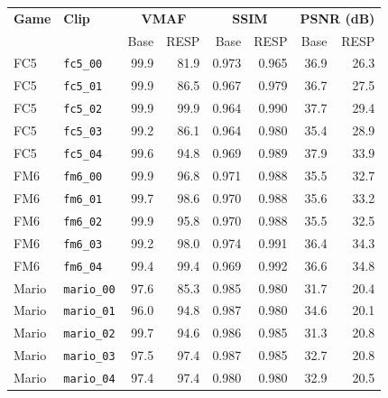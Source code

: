 \begin{tabular}{@{}llrrrrrr@{}}
\toprule
\textbf{Game} & \textbf{Clip} & \multicolumn{2}{c}{\textbf{VMAF}} & \multicolumn{2}{c}{\textbf{SSIM}} & \multicolumn{2}{c}{\textbf{PSNR (dB)}} \\
 & & Base & RESP & Base & RESP & Base & RESP \\
\midrule
FC5 & \texttt{fc5\_00} & 99.9 & 81.9 & 0.973 & 0.965 & 36.9 & 26.3 \\
FC5 & \texttt{fc5\_01} & 99.9 & 86.5 & 0.967 & 0.979 & 36.7 & 27.5 \\
FC5 & \texttt{fc5\_02} & 99.9 & 99.9 & 0.964 & 0.990 & 37.7 & 29.4 \\
FC5 & \texttt{fc5\_03} & 99.2 & 86.1 & 0.964 & 0.980 & 35.4 & 28.9 \\
FC5 & \texttt{fc5\_04} & 99.6 & 94.8 & 0.969 & 0.989 & 37.9 & 33.9 \\
\midrule
FM6 & \texttt{fm6\_00} & 99.9 & 96.8 & 0.971 & 0.988 & 35.5 & 32.7 \\
FM6 & \texttt{fm6\_01} & 99.7 & 98.6 & 0.970 & 0.988 & 35.6 & 33.2 \\
FM6 & \texttt{fm6\_02} & 99.9 & 95.8 & 0.970 & 0.988 & 35.5 & 32.5 \\
FM6 & \texttt{fm6\_03} & 99.2 & 98.0 & 0.974 & 0.991 & 36.4 & 34.3 \\
FM6 & \texttt{fm6\_04} & 99.4 & 99.4 & 0.969 & 0.992 & 36.6 & 34.8 \\
\midrule
Mario & \texttt{mario\_00} & 97.6 & 85.3 & 0.985 & 0.980 & 31.7 & 20.4 \\
Mario & \texttt{mario\_01} & 96.0 & 94.8 & 0.987 & 0.980 & 34.6 & 20.1 \\
Mario & \texttt{mario\_02} & 99.7 & 94.6 & 0.986 & 0.985 & 31.3 & 20.8 \\
Mario & \texttt{mario\_03} & 97.5 & 97.4 & 0.987 & 0.985 & 32.7 & 20.8 \\
Mario & \texttt{mario\_04} & 97.4 & 97.4 & 0.980 & 0.980 & 32.9 & 20.5 \\
\bottomrule
\end{tabular}
